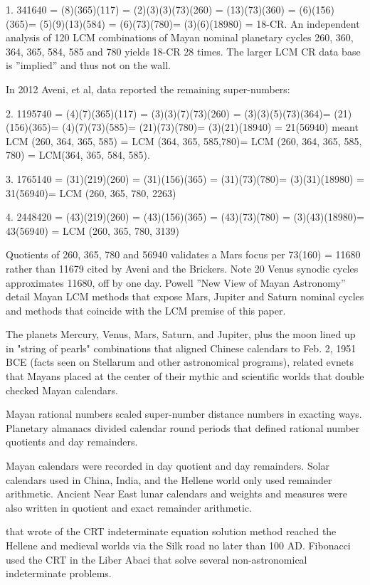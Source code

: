 \documentclass[12pt]{article}
\begin{document}
1. 341640 = (8)(365)(117) = (2)(3)(3)(73)(260) = (13)(73)(360) = (6)(156)(365)= (5)(9)(13)(584) = (6)(73)(780)= (3)(6)(18980) = 18-CR. An independent analysis of 120 LCM combinations of Mayan nominal planetary cycles 260, 360, 364, 365, 584, 585 and 780 yields 18-CR 28 times. The larger LCM CR data base is ”implied” and thus not on the wall.

In 2012 Aveni, et al, data reported the remaining super-numbers:

2. 1195740 = (4)(7)(365)(117) = (3)(3)(7)(73)(260) = (3)(3)(5)(73)(364)= (21)(156)(365)= (4)(7)(73)(585)= (21)(73)(780)= (3)(21)(18940) = 21(56940) meant LCM (260, 364, 365, 585) = LCM (364, 365, 585,780)= LCM (260, 364, 365, 585, 780) = LCM(364, 365, 584, 585).

3. 1765140 = (31)(219)(260) = (31)(156)(365) = (31)(73)(780)= (3)(31)(18980) = 31(56940)= LCM (260, 365, 780, 2263)

4. 2448420 = (43)(219)(260) = (43)(156)(365) = (43)(73)(780) = (3)(43)(18980)= 43(56940) = LCM (260, 365, 780, 3139)

Quotients of 260, 365, 780 and 56940 validates a Mars focus per 73(160) = 11680 rather than 11679 cited by Aveni and the Brickers. Note 20 Venus synodic cycles approximates 11680, off by one day. Powell ”New View of Mayan Astronomy” detail Mayan LCM methods that expose Mars, Jupiter and Saturn nominal cycles and methods that coincide with the LCM premise of this paper.


The  planets Mercury, Venus, Mars, Saturn, and Jupiter, plus the moon lined up in "string of pearls" combinations that aligned Chinese calendars to Feb. 2, 1951 BCE (facts seen on Stellarum and other astronomical programs), related evnets that Mayans placed at the center of their mythic and scientific worlds that double checked Mayan calendars.   

Mayan rational numbers scaled super-number distance numbers in exacting ways. Planetary almanacs divided calendar round periods that defined rational number quotients  and day remainders.

Mayan calendars were recorded in day quotient and day remainders. Solar calendars used in China, India, and the Hellene world only used remainder arithmetic. Ancient Near East lunar calendars and weights and measures were also written in quotient and exact remainder arithmetic. 

 that wrote of the CRT indeterminate equation solution method reached the Hellene and medieval worlds via the Silk road no later than 100 AD. Fibonacci used the CRT in the Liber Abaci that solve several non-astronomical indeterminate problems.
\end{document}
